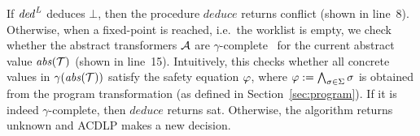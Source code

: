 If $\mathit{ded}^{\mathit{L}}$ deduces $\bot$, then 
the procedure $\mathit{deduce}$ returns \textsf{conflict} (shown in line~8).
Otherwise, when a fixed-point is reached, i.e.~the worklist is empty, we check whether
the abstract transformers $\mathcal{A}$ are $\gamma$-complete~\cite{dhk2013-popl} for the current abstract value $\mathit{abs}(\mathcal{T})$ 
(shown in line~15).
%
Intuitively, this checks whether all concrete values in 
$\gamma(\mathit{abs}(\mathcal{T}))$ satisfy the safety equation $\varphi$, where 
$\varphi:= \bigwedge_{\sigma\in\Sigma} \sigma$ is obtained 
from the program transformation (as defined in Section~\ref{sec:program}).
%
If it is indeed 
$\gamma$-complete, then $\mathit{deduce}$ returns \textsf{sat}.  Otherwise, the 
algorithm returns \textsf{unknown} and ACDLP makes a new decision.    
  
